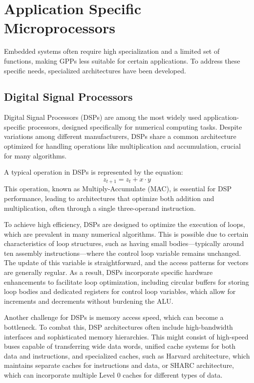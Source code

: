 \section{Application Specific Microprocessors}

Embedded systems often require high specialization and a limited set of functions, making GPPs less suitable for certain applications. 
To address these specific needs, specialized architectures have been developed.

\subsection{Digital Signal Processors}
Digital Signal Processors (DSPs) are among the most widely used application-specific processors, designed specifically for numerical computing tasks. 
Despite variations among different manufacturers, DSPs share a common architecture optimized for handling operations like multiplication and accumulation, crucial for many algorithms.

A typical operation in DSPs is represented by the equation:
\[z_{t+1} = z_t + x \cdot y\]
This operation, known as Multiply-Accumulate (MAC), is essential for DSP performance, leading to architectures that optimize both addition and multiplication, often through a single three-operand instruction.

To achieve high efficiency, DSPs are designed to optimize the execution of loops, which are prevalent in many numerical algorithms. 
This is possible due to certain characteristics of loop structures, such as having small bodies—typically around ten assembly instructions—where the control loop variable remains unchanged.
The update of this variable is straightforward, and the access patterns for vectors are generally regular.
As a result, DSPs incorporate specific hardware enhancements to facilitate loop optimization, including circular buffers for storing loop bodies and dedicated registers for control loop variables, which allow for increments and decrements without burdening the ALU.

Another challenge for DSPs is memory access speed, which can become a bottleneck.
To combat this, DSP architectures often include high-bandwidth interfaces and sophisticated memory hierarchies. 
This might consist of high-speed buses capable of transferring wide data words, unified cache systems for both data and instructions, and specialized caches, such as Harvard architecture, which maintains separate caches for instructions and data, or SHARC architecture, which can incorporate multiple Level 0 caches for different types of data.

